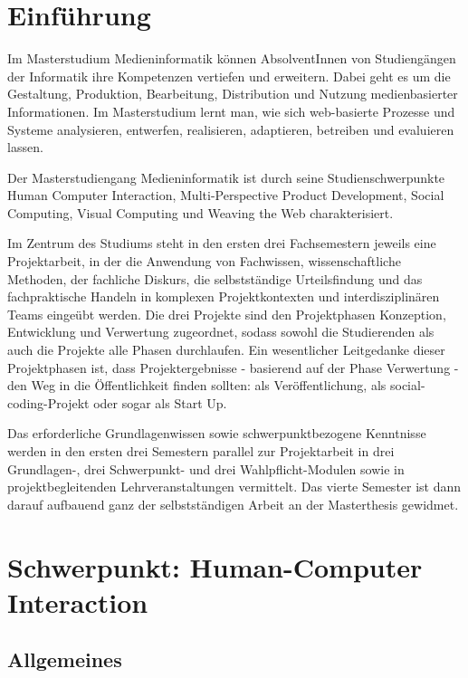 \chapter{Einführung}\label{einfuxfchrung}

Im Masterstudium Medieninformatik können AbsolventInnen von
Studiengängen der Informatik ihre Kompetenzen vertiefen und erweitern.
Dabei geht es um die Gestaltung, Produktion, Bearbeitung, Distribution
und Nutzung medienbasierter Informationen. Im Masterstudium lernt man,
wie sich web-basierte Prozesse und Systeme analysieren, entwerfen,
realisieren, adaptieren, betreiben und evaluieren lassen.

Der Masterstudiengang Medieninformatik ist durch seine
Studienschwerpunkte Human Computer Interaction, Multi-Perspective
Product Development, Social Computing, Visual Computing und Weaving the
Web charakterisiert.

Im Zentrum des Studiums steht in den ersten drei Fachsemestern jeweils
eine Projektarbeit, in der die Anwendung von Fachwissen,
wissenschaftliche Methoden, der fachliche Diskurs, die selbstständige
Urteilsfindung und das fachpraktische Handeln in komplexen
Projektkontexten und interdisziplinären Teams eingeübt werden. Die drei
Projekte sind den Projektphasen Konzeption, Entwicklung und Verwertung
zugeordnet, sodass sowohl die Studierenden als auch die Projekte alle
Phasen durchlaufen. Ein wesentlicher Leitgedanke dieser Projektphasen
ist, dass Projektergebnisse - basierend auf der Phase Verwertung - den
Weg in die Öffentlichkeit finden sollten: als Veröffentlichung, als
social-coding-Projekt oder sogar als Start Up.

Das erforderliche Grundlagenwissen sowie schwerpunktbezogene Kenntnisse
werden in den ersten drei Semestern parallel zur Projektarbeit in drei
Grundlagen-, drei Schwerpunkt- und drei Wahlpflicht-Modulen sowie in
projektbegleitenden Lehrveranstaltungen vermittelt. Das vierte Semester
ist dann darauf aufbauend ganz der selbstständigen Arbeit an der
Masterthesis gewidmet.

\chapter{Schwerpunkt: Human-Computer
Interaction}\label{schwerpunkt-human-computer-interaction}

\section*{Allgemeines}\label{allgemeines}

